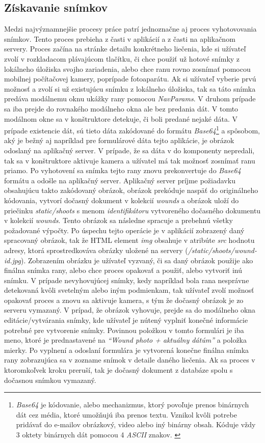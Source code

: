 \subsection{Získavanie snímkov}
Medzi najvýznamnejšie procesy práce patrí jednoznačne aj proces vyhotovovania snímkov. Tento proces prebieha z časti v aplikácií a z časti na aplikačnom servery. Proces začína na stránke detailu konkrétneho liečenia, kde si užívateľ zvolí v rozkladacom plávajúcom tlačítku, či chce použiť už hotové snímky z lokálneho úložiska svojho zariadenia, alebo chce ranu rovno zosnímať pomocou mobilnej počítačovej kamery, poprípade fotoaparátu. Ak si užívateľ vyberie prvú možnosť a zvolí si už existujúcu snímku z lokálneho úložiska, tak sa táto snímka predáva modálnemu oknu ukážky rany pomocou \textit{NavParams}. V druhom prípade sa iba prejde do rovnakého modálneho okna ale bez predania dát. V tomto modálnom okne sa v konštruktore detekuje, či boli predané nejaké dáta. V prípade existencie dát, sú tieto dáta zakódované do formátu \textit{Base64}\footnote{\textit{Base64} je kódovanie, alebo mechanizmus, ktorý povoľuje prenos binárnych dát cez média, ktoré umožňujú iba prenos textu. Vznikol kvôli potrebe pridávať do e-mailov obrázkový, video alebo iný binárny obsah. Kóduje vždy 3 oktety binárnych dát pomocou 4 \textit{ASCII} znakov. \cite{Menon13122008}} a spôsobom, aký je bežný aj napríklad pre formulárové dáta tejto aplikácie, je obrázok odoslaný na aplikačný server. V prípade, že sa dáta v do komponenty nepredali, tak sa v konštruktore aktivuje kamera a užívatel má tak možnosť zosnímať ranu priamo. Po vyhotovení sa snímka tejto rany znovu prekonvertuje do \textit{Base64} formátu a odošle na aplikačný server. Aplikačný server príjme požiadavku obsahujúcu takto zakódovaný obrázok, obrázok prekóduje naspäť do originálneho kódovania, vytvorí dočasný dokument v kolekcií \textit{wounds} a obrázok uloží do priečinku \textit{static/shoots} s menom \textit{identifikátoru} vytvoreného dočasného dokumentu v kolekcií \textit{wounds}. Tento obrázok sa následne spracuje a prebehnú všetky požadované výpočty. Po úspechu tejto operácie je v aplikácií zobrazený daný spracovaný obrázok, tak že HTML element \textit{img} obsahuje v atribúte \textit{src} hodnotu adresy, ktorá sprostredkováva obrázky uložené na servery (\textit{/static/shoots/wound-id.jpg}). Zobrazením obrázku je užívateľ vyzvaný, či sa daný obrázok použije ako finálna snímka rany, alebo chce proces opakovať a použiť, alebo vytvoriť inú snímku. V prípade nevyhovujúcej snímky, kedy napríklad bola rana nesprávne detekovaná kvôli svetelným alebo iným podmienkam, tak užívateľ zvolí možnosť opakovať proces a znovu sa aktivuje kamera, s tým že dočasný obrázok je zo serveru vymazaný. V prípad, že obrázok vyhovuje, prejde sa do modálneho okna editácie/vytvárania snímky, kde užívateľ je nútený vyplniť konečné informácie potrebné pre vytvorenie snímky. Povinnou položkou v tomto formulári je iba meno, ktoré je prednastavené na \textit{“Wound photo + aktuálny dátúm”} a položka mierky. Po vyplnení a odoslaní formulára je vytvorená konečne finálna snímka rany zobrazujúca sa v zozname snímok v detaile daného liečenia. Ak sa proces v ktoromkoľvek kroku preruší, tak je dočasný dokument z databáze spolu s dočasnou snímkou vymazaný.

